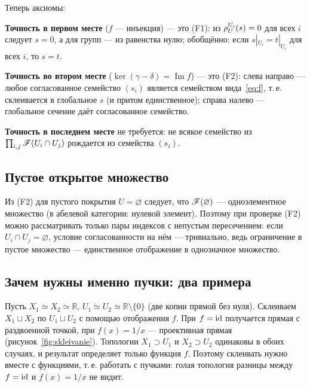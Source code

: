 Теперь аксиомы:
\begin{bullets}
\item \textbf{Точность в первом месте} ($f$ --- инъекция) --- это (F1):
 из $\rho^{U_i}_{U}(s)=0$ для всех $i$ следует $s=0$, а для групп ---
 из равенства нулю; обобщённо: если $s|_{U_i}=t|_{U_i}$ для всех $i$,
 то $s=t$.
\item \textbf{Точность во втором месте} ($\ker(\gamma-\delta)=
 \operatorname{Im}f$) --- это (F2): слева направо --- любое согласованное
 семейство $(s_i)$ является семейством вида~\eqref{eq:f}, т.\,е.
 склеивается в глобальное $s$ (и притом единственное); справа налево ---
 глобальное сечение даёт согласованное семейство.
\item \textbf{Точность в последнем месте} не требуется: не всякое
 семейство из $\prod_{i,j}\mathscr{F}(U_i\cap U_j)$ рождается из
 семейства $(s_i)$.
\end{bullets}

\begin{bookbox}
\end{bookbox}

\subsection{Пустое открытое множество}
Из (F2) для пустого покрытия $U=\varnothing$ следует, что
$\mathscr{F}(\varnothing)$ --- одноэлементное множество (в абелевой
категории: нулевой элемент). Поэтому при проверке (F2) можно
рассматривать только пары индексов с непустым пересечением: если
$U_i\cap U_j=\varnothing$, условие согласованности на нём ---
тривиально, ведь ограничение в пустое множество --- единственное
отображение в однозначное множество.

\subsection{Зачем нужны именно пучки: два примера}
\leavevmode\par
\begin{exm}
Пусть $X_1\simeq X_2\simeq\mathbb{R}$, $U_1\simeq U_2\simeq
\mathbb{R}\setminus\{0\}$ (две копии прямой без нуля). Склеиваем
$X_1\sqcup X_2$ по $U_1\sqcup U_2$ с помощью отображения $f$. При
$f=\mathrm{id}$ получается прямая с раздвоенной точкой, при $f(x)=1/x$ ---
проективная прямая (рисунок~\ref{fig:skleivanie}). Топологии
$X_1\supset U_1$ и $X_2\supset U_2$ одинаковы в обоих случаях,
и результат определяет только функция $f$. Поэтому склеивать
нужно вместе с функциями, т.\,е. работать с пучками: голая топология
разницы между $f=\mathrm{id}$ и $f(x)=1/x$ не видит.
\end{exm}

